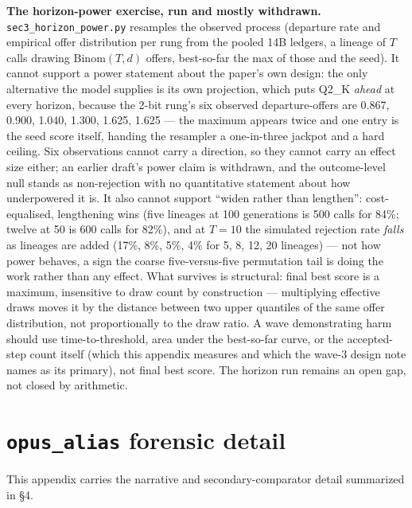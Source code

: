 \textbf{The horizon-power exercise, run and mostly withdrawn.} \texttt{sec3\_horizon\_power.py} resamples the observed process (departure rate and empirical offer distribution per rung from the pooled 14B ledgers, a lineage of $T$ calls drawing $\mathrm{Binom}(T, d)$ offers, best-so-far the max of those and the seed). It cannot support a power statement about the paper's own design: the only alternative the model supplies is its own projection, which puts Q2\_K \emph{ahead} at every horizon, because the 2-bit rung's six observed departure-offers are 0.867, 0.900, 1.040, 1.300, 1.625, 1.625 --- the maximum appears twice and one entry is the seed score itself, handing the resampler a one-in-three jackpot and a hard ceiling. Six observations cannot carry a direction, so they cannot carry an effect size either; an earlier draft's power claim is withdrawn, and the outcome-level null stands as non-rejection with no quantitative statement about how underpowered it is. It also cannot support ``widen rather than lengthen'': cost-equalised, lengthening wins (five lineages at 100 generations is 500 calls for 84\%; twelve at 50 is 600 calls for 82\%), and at $T = 10$ the simulated rejection rate \emph{falls} as lineages are added (17\%, 8\%, 5\%, 4\% for 5, 8, 12, 20 lineages) --- not how power behaves, a sign the coarse five-versus-five permutation tail is doing the work rather than any effect. What survives is structural: final best score is a maximum, insensitive to draw count by construction --- multiplying effective draws moves it by the distance between two upper quantiles of the same offer distribution, not proportionally to the draw ratio. A wave demonstrating harm should use time-to-threshold, area under the best-so-far curve, or the accepted-step count itself (which this appendix measures and which the wave-3 design note names as its primary), not final best score. The horizon run remains an open gap, not closed by arithmetic.

\section{\texttt{opus\_alias} forensic detail}

This appendix carries the narrative and secondary-comparator detail summarized in \S4.

